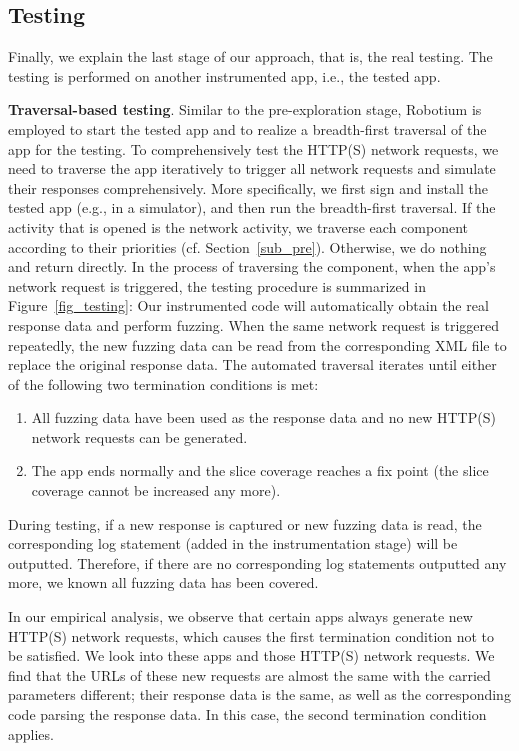 \documentclass[sigconf,review, anonymous]{acmart}
\begin{document}
\subsection{Testing}\label{sub_testing}
Finally, we explain the last stage of our approach, that is, the real testing. The testing is performed on another instrumented app, i.e., the tested app. 

\textbf{Traversal-based testing}. Similar to the pre-exploration stage, \textsf{Robotium} is employed to start the tested app and to realize a breadth-first traversal of the app for the testing. To comprehensively test the HTTP(S) network requests, we need to traverse the app iteratively to trigger all network requests and simulate their responses comprehensively. More specifically, we first sign and install the tested app (e.g., in a simulator), and then run the breadth-first traversal. If the activity that is opened is the network activity, we traverse each component according to their priorities (cf. Section~\ref{sub_pre}). Otherwise, we do nothing and return directly. In the process of traversing the component, when the app's network request is triggered, the testing procedure is summarized in Figure~\ref{fig_testing}: Our instrumented code will automatically obtain the real response data and perform fuzzing. When the same network request is triggered repeatedly, the new fuzzing data can be read from the corresponding XML file to replace the original response data. The automated traversal iterates until either of the following two termination conditions is met: 
\begin{enumerate}
\item All fuzzing data have been used as the response data and no new HTTP(S) network requests can be generated.
\item The app ends normally and the slice coverage reaches a fix point (the slice coverage cannot be increased any more).
\end{enumerate}

During testing, if a new response is captured or new fuzzing data is read, the corresponding log statement (added in the instrumentation stage) will be outputted. Therefore, if there are no corresponding log statements outputted any more, we known all fuzzing data has been covered. 

In our empirical analysis, we observe that certain apps always generate new HTTP(S) network requests, which causes the first termination condition not to be satisfied. We look into these apps and those HTTP(S) network requests. We find that the URLs of these new requests are almost the same with the carried parameters different; their response data is the same, as well as the corresponding code parsing the response data. In this case, the second termination condition applies.
\end{document}

